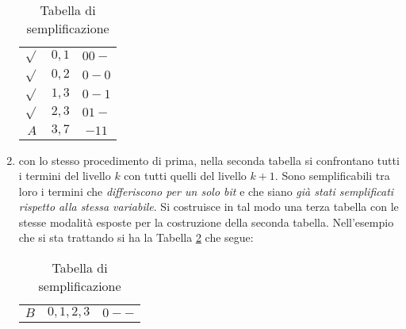 \documentclass[a4paper]{extarticle}
\renewcommand\arraystretch{}
\begin{document}
\begin{enumerate}
  \begin{table}[H]
      \centering
      \setlength{\tabcolsep}{8pt}
      \renewcommand{\arraystretch}{1.2}
      \begin{tabular}{c|c|c}
           $\sqrt{}$ & $0,1$ & $00-$\\
           $\sqrt{}$ & $0,2$ & $0-0$\\
           \hline
           $\sqrt{}$ & $1,3$ & $0-1$\\
           $\sqrt{}$ & $2,3$ & $01-$\\
           \hline
           $A$ & $3,7$ & $-11$\\
      \end{tabular}
      \caption{Tabella di semplificazione}
      \label{tab:semplificazione_quine_mc_cuskey_1}
  \end{table}

  \item con lo stesso procedimento di prima, nella seconda tabella si confrontano tutti i termini del livello $k$ con tutti quelli del livello $k + 1$. Sono semplificabili tra loro i termini che \emph{differiscono per un solo bit} e che siano \emph{già stati semplificati rispetto alla stessa variabile}. Si costruisce in tal modo una terza tabella con le stesse modalità esposte per la costruzione della seconda tabella. Nell’esempio che si sta trattando si ha la Tabella \ref{tab:semplificazione_quine_mc_cuskey_2} che segue:

  \begin{table}[H]
      \centering
      \setlength{\tabcolsep}{8pt}
      \renewcommand{\arraystretch}{1.2}
      \begin{tabular}{c|c|c}
           $B$ & $0,1,2,3$ & $0--$\\
      \end{tabular}
      \caption{Tabella di semplificazione}
      \label{tab:semplificazione_quine_mc_cuskey_2}
  \end{table}


\end{enumerate}
\end{document}
